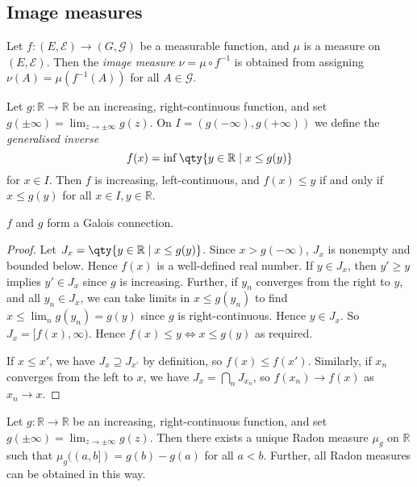 \subsection{Image measures}
\begin{definition}
	Let $f \colon (E,\mathcal E) \to (G,\mathcal G)$ be a measurable function, and $\mu$ is a measure on $(E, \mathcal E)$.
	Then the \emph{image measure} $\nu = \mu \circ f^{-1}$ is obtained from assigning $\nu(A) = \mu(f^{-1}(A))$ for all $A \in \mathcal G$.
\end{definition}
\begin{lemma}
	Let $g \colon \mathbb R \to \mathbb R$ be an increasing, right-continuous function, and set $g(\pm\infty) = \lim_{z \to \pm \infty} g(z)$.
	On $I = (g(-\infty), g(+\infty))$ we define the \emph{generalised inverse}
	\[ f(x) = \inf \qty{y \in \mathbb R \mid x \leq g(y)} \]
	for $x \in I$.
	Then $f$ is increasing, left-continuous, and $f(x) \leq y$ if and only if $x \leq g(y)$ for all $x \in I, y \in \mathbb R$.
\end{lemma}
\begin{remark}
	$f$ and $g$ form a Galois connection.
\end{remark}
\begin{proof}
	Let $J_x = \qty{y \in \mathbb R \mid x \leq g(y)}$.
	Since $x > g(-\infty)$, $J_x$ is nonempty and bounded below.
	Hence $f(x)$ is a well-defined real number.
	If $y \in J_x$, then $y' \geq y$ implies $y' \in J_x$ since $g$ is increasing.
	Further, if $y_n$ converges from the right to $y$, and all $y_n \in J_x$, we can take limits in $x \leq g(y_n)$ to find $x \leq \lim_n g(y_n) = g(y)$ since $g$ is right-continuous.
	Hence $y \in J_x$.
	So $J_x = [f(x), \infty)$.
	Hence $f(x) \leq y \iff x \leq g(y)$ as required.

	If $x \leq x'$, we have $J_x \supseteq J_{x'}$ by definition, so $f(x) \leq f(x')$.
	Similarly, if $x_n$ converges from the left to $x$, we have $J_x = \bigcap_n J_{x_n}$, so $f(x_n) \to f(x)$ as $x_n \to x$.
\end{proof}
\begin{theorem}
	Let $g \colon \mathbb R \to \mathbb R$ be an increasing, right-continuous function, and set $g(\pm\infty) = \lim_{z \to \pm \infty} g(z)$.
	Then there exists a unique Radon measure $\mu_g$ on $\mathbb R$ such that $\mu_g((a,b]) = g(b) - g(a)$ for all $a < b$.
	Further, all Radon measures can be obtained in this way.
\end{theorem}
